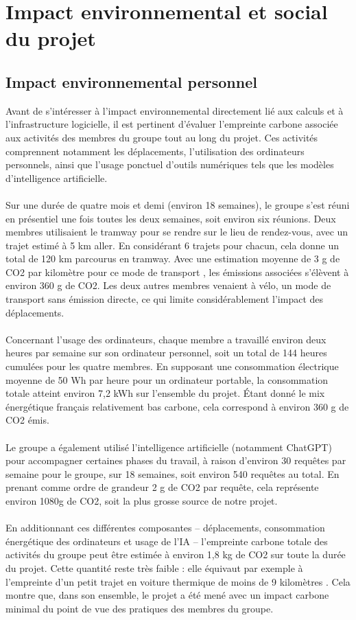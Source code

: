 \documentclass[12pt]{article}
\begin{document}
\section{Impact environnemental et social du projet}
\subsection{Impact environnemental personnel}
Avant de s'intéresser à l’impact environnemental directement lié aux calculs et à l’infrastructure logicielle, il est pertinent d’évaluer l’empreinte carbone associée aux activités des membres du groupe tout au long du projet. Ces activités comprennent notamment les déplacements, l’utilisation des ordinateurs personnels, ainsi que l’usage ponctuel d’outils numériques tels que les modèles d’intelligence artificielle.\\
\\
Sur une durée de quatre mois et demi (environ 18 semaines), le groupe s’est réuni en présentiel une fois toutes les deux semaines, soit environ six réunions. Deux membres utilisaient le tramway pour se rendre sur le lieu de rendez-vous, avec un trajet estimé à 5 km aller. En considérant 6 trajets pour chacun, cela donne un total de 120 km parcourus en tramway. Avec une estimation moyenne de 3 g de CO2 par kilomètre pour ce mode de transport \cite{ADEME}, les émissions associées s’élèvent à environ 360 g de CO2. Les deux autres membres venaient à vélo, un mode de transport sans émission directe, ce qui limite considérablement l’impact des déplacements.\\
\\
Concernant l’usage des ordinateurs, chaque membre a travaillé environ deux heures par semaine sur son ordinateur personnel, soit un total de 144 heures cumulées pour les quatre membres. En supposant une consommation électrique moyenne de 50 Wh par heure pour un ordinateur portable, la consommation totale atteint environ 7,2 kWh sur l’ensemble du projet. Étant donné le mix énergétique français relativement bas carbone, cela correspond à environ 360 g de CO2 émis.\\
\\
Le groupe a également utilisé l’intelligence artificielle (notamment ChatGPT) pour accompagner certaines phases du travail, à raison d’environ 30 requêtes par semaine pour le groupe, sur 18 semaines, soit environ 540 requêtes au total. En prenant comme ordre de grandeur 2 g de CO2 par requête, cela représente environ 1080g de CO2, soit la plus grosse source de notre projet.\\
\\
En additionnant ces différentes composantes – déplacements, consommation énergétique des ordinateurs et usage de l’IA – l’empreinte carbone totale des activités du groupe peut être estimée à environ 1,8 kg de CO2 sur toute la durée du projet. Cette quantité reste très faible : elle équivaut par exemple à l’empreinte d’un petit trajet en voiture thermique de moins de 9 kilomètres \cite{ADEME}. Cela montre que, dans son ensemble, le projet a été mené avec un impact carbone minimal du point de vue des pratiques des membres du groupe.
\end{document}
